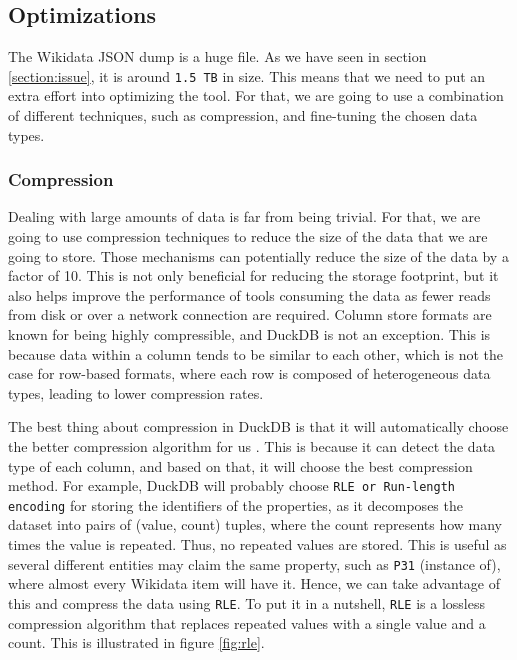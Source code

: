 \subsection{Optimizations}

The Wikidata JSON dump is a huge file. As we have seen in section \ref{section:issue}, it is around \texttt{1.5 TB} in size. This means that we need to put an extra effort into optimizing the tool. For that, we are going to use a combination of different techniques, such as compression, and fine-tuning the chosen data types.

\subsubsection{Compression}

Dealing with large amounts of data is far from being trivial. For that, we are going to use compression techniques to reduce the size of the data that we are going to store. Those mechanisms can potentially reduce the size of the data by a factor of 10. This is not only beneficial for reducing the storage footprint, but it also helps improve the performance of tools consuming the data as fewer reads from disk or over a network connection are required. Column store formats are known for being highly compressible, and DuckDB is not an exception. This is because data within a column tends to be similar to each other, which is not the case for row-based formats, where each row is composed of heterogeneous data types, leading to lower compression rates.

The best thing about compression in DuckDB is that it will automatically choose the better compression algorithm for us \cite{Raasveldt_2022}. This is because it can detect the data type of each column, and based on that, it will choose the best compression method. For example, DuckDB will probably choose \texttt{RLE or Run-length encoding} for storing the identifiers of the properties, as it decomposes the dataset into pairs of (value, count) tuples, where the count represents how many times the value is repeated. Thus, no repeated values are stored. This is useful as several different entities may claim the same property, such as \texttt{P31} (instance of), where almost every Wikidata item will have it. Hence, we can take advantage of this and compress the data using \texttt{RLE}. To put it in a nutshell, \texttt{RLE} is a lossless compression algorithm that replaces repeated values with a single value and a count. This is illustrated in figure \ref{fig:rle}.

